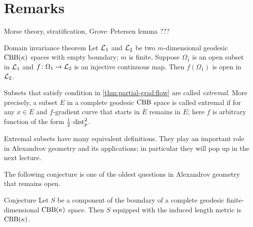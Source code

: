 \section{Remarks}

Morse theory, stratification, Grove--Petersen lemma ???

\begin{thm}{Domain invariance theorem}
Let $\mathcal{L}_1$ and $\mathcal{L}_2$ be two $m$-dimensional geodesic $\mathrm{CBB}(\kappa)$ spaces with empty boundary; $m$ is finite.
Suppose $\Omega_1$ is an open subset in $\mathcal{L}_1$ and $f\colon\Omega_1\to \mathcal{L}_2$ is an injective continuous map.
Then $f(\Omega_1)$ is open in $\mathcal{L}_2$.
\end{thm}

Subsets that satisfy condition in \ref{thm:partial-grad:flow} are called \emph{extremal}.
More precisely, a subset $E$ in a complete geodesic $\mathrm{CBB}$ space is called extremal if for any $x\in E$
and $f$-gradient curve that starts in $E$ remains in $E$;
here $f$ is arbitrary function of the form $\tfrac12\cdot \distfun_p^2$.

Extremal subsets have many equivalent definitions.
They play an important role in Alexandrov geometry and its applications;
in particular they will pop up in the next lecture.

The following conjecture is one of the oldest questions in Alexandrov geometry that remains open.

\begin{thm}{Conjecture}
Let $S$ be a component of the boundary of a complete geodesic finite-dimensional $\mathrm{CBB}(\kappa)$ space.
Then $S$ equipped with the induced length metric is $\mathrm{CBB}(\kappa)$.
\end{thm}



